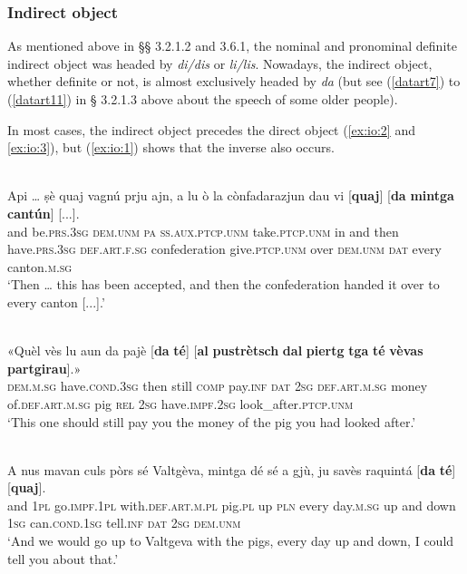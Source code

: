 \subsubsection{Indirect object}
As mentioned above in §§ 3.2.1.2 and 3.6.1, the nominal and pronominal definite indirect object was headed by \textit{di/dis} or \textit{li/lis}. Nowadays, the indirect object, whether definite or not, is almost exclusively headed by \textit{da} (but see (\ref{datart7}) to (\ref{datart11}) in § 3.2.1.3 above about the speech of some older people).

In most cases, the indirect object precedes the direct object (\ref{ex:io:2} and \ref{ex:io:3}), but (\ref{ex:io:1}) shows that the inverse also occurs.
 
\ea\label{ex:io:1}
\\
\gll Api … ṣè quaj vagnú prju ajn, a lu ò la cònfadarazjun dau vi [\textbf{quaj}] [\textbf{da} \textbf{mintga} \textbf{cantún}] [...].   \\
and {} be.\textsc{prs.3sg} \textsc{dem.unm} \textsc{pa ss.aux.ptcp.unm} take.\textsc{ptcp.unm} in and then have.\textsc{prs.3sg} \textsc{def.art.f.sg} confederation give.\textsc{ptcp.unm} over \textsc{dem.unm} \textsc{dat} every canton.\textsc{m.sg}\\
\glt `Then … this has been accepted, and then the confederation handed it over to every canton [...].'
\z

\ea\label{ex:io:2}
\\
\gll  «Quèl vès lu aun da pajè [\textbf{da} \textbf{té}] [\textbf{al} \textbf{pustrètsch} \textbf{dal} \textbf{piertg} \textbf{tga} \textbf{té} \textbf{vèvas} \textbf{partgirau}].» \\
\textsc{dem.m.sg} have.\textsc{cond.3sg} then still \textsc{comp} pay.\textsc{inf} \textsc{dat} \textsc{2sg} \textsc{def.art.m.sg} money of.\textsc{def.art.m.sg} pig \textsc{rel} \textsc{2sg} have.\textsc{impf.2sg} look\_after.\textsc{ptcp.unm}\\
\glt `This one should still pay you the money of the pig you had looked after.'
\z

\ea
\label{ex:io:3}
\\
\gll    A nus mavan culs pòrs sé Valtgèva, mintga dé sé a gjù, ju savès raquintá [\textbf{da} \textbf{té}] [\textbf{quaj}].\\
and \textsc{1pl}  go.\textsc{impf.1pl} with.\textsc{def.art.m.pl} pig.\textsc{pl} up \textsc{pln} every day.\textsc{m.sg} up and down  \textsc{1sg}  can.\textsc{cond.1sg}  tell.\textsc{inf}  \textsc{dat}  \textsc{2sg} \textsc{dem.unm}\\
\glt `And we would go up to Valtgeva with the pigs, every day up and down, I could tell you about that.'
\z

